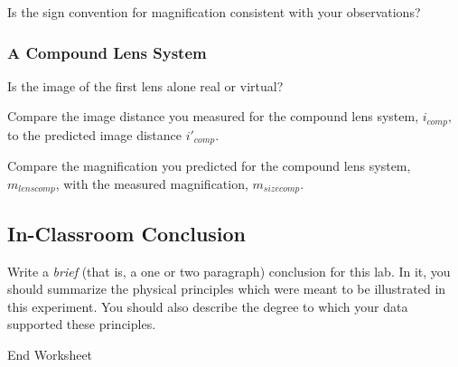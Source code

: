 \noindent
Is the sign convention for magnification consistent with your observations?
\vspace*{2.3cm}



\subsubsection{A Compound Lens System}  

Is the image of the first lens alone real or virtual? \\
\vspace*{.3cm} 

\noindent
Compare the image distance you measured for the compound lens system,
$i_{comp},$ to the predicted image distance $i'_{comp}.$ \\
\vspace*{4cm} 

\noindent
Compare the magnification you predicted  for the compound lens system,
$m_{lenscomp}$, with the measured magnification, $m_{sizecomp}$. \\
\vspace*{3cm} 

\newpage
\subsection{In-Classroom Conclusion}

Write a {\it brief} (that is, a one or two paragraph) conclusion for
this lab. In it, you should summarize the physical
principles which were meant to be illustrated in this experiment. You
should also describe the degree to which your data supported these
principles.



\vfill
{\Large End Worksheet} 
\renewcommand{\thesection}{\thechapter.\arabic{section}}


















